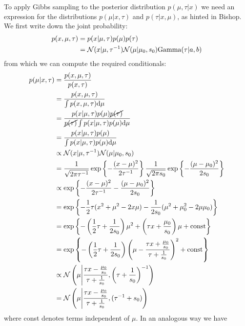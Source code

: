 \documentclass{amsmlaj}
\begin{document}
\begin{problem}
\newpage
\begin{sol}
	To apply Gibbs sampling to the posterior distribution $p(\mu,\tau|x)$ we need
	an expression for the distributions $p(\mu|x,\tau)$ and $p(\tau|x,\mu)$, as
	hinted in Bishop. We first write down the joint probability:
	\begin{align}
		p(x,\mu,\tau)
		&=p(x|\mu,\tau)p(\mu)p(\tau) \\
		&=\mathcal{N}(x|\mu,\tau^{-1})\mathcal{N}(\mu|\mu_0,s_0)\text{Gamma}(\tau|a,b)
	\end{align}
	from which we can compute the required conditionals:
	\begin{align}
		p(\mu|x,\tau)
		&=\frac{p(x,\mu,\tau)}{p(x,\tau)} \\
		&=\frac{p(x,\mu,\tau)}{\int p(x,\mu,\tau)\mathrm{d}\mu} \\
		&=\frac{p(x|\mu,\tau)p(\mu)\cancel{p(\tau)}}{\cancel{p(\tau)}\int p(x|\mu,\tau)p(\mu)\mathrm{d}\mu} \\
		&=\frac{p(x|\mu,\tau)p(\mu)}{\int p(x|\mu,\tau)p(\mu)\mathrm{d}\mu} \\
		&\propto \mathcal{N}(x|\mu,\tau^{-1}) \mathcal{N}(\mu|\mu_0,s_0) \\
		&=\frac{1}{\sqrt{2\pi\tau^{-1}}} \exp\left\{
			-\frac{(x-\mu)^2}{2\tau^{-1}}
		\right\} \frac{1}{\sqrt{2\pi s_0}} \exp\left\{
			-\frac{(\mu-\mu_0)^2}{2s_0}
		\right\} \\
		&\propto \exp\left\{
			-\frac{(x-\mu)^2}{2\tau^{-1}}
			-\frac{(\mu-\mu_0)^2}{2s_0}
		\right\} \\
		&= \exp\left\{
			-\frac{1}{2}\tau(x^2+\mu^2-2x\mu)
			-\frac{1}{2s_0}(\mu^2+\mu_0^2-2\mu\mu_0)
		\right\} \\
		&= \exp\left\{
			-\left(\frac{1}{2}\tau+\frac{1}{2s_0}\right)\mu^2
			+\left(\tau x + \frac{\mu_0}{s_0}\right)\mu
			+ \text{const}
		\right\} \\
		&= \exp\left\{
			-\left(\frac{1}{2}\tau+\frac{1}{2s_0}\right)
			\left(\mu-\frac{\tau x + \frac{\mu_0}{s_0}}{\tau+\frac{1}{s_0}}\right)^2
			+ \text{const}
		\right\} \\
		&\propto \mathcal{N}\left(
			\mu\middle|\frac{\tau x - \frac{\mu_0}{s_0}}{\tau+\frac{1}{s_0}},\left(\tau+\frac{1}{s_0}\right)^{-1}
		\right) \\
		&= \mathcal{N}\left(
		\mu\middle|\frac{\tau x - \frac{\mu_0}{s_0}}{\tau+\frac{1}{s_0}},(\tau^{-1}+s_0)
		\right)
	\end{align}
	where const denotes terms independent of $\mu$. In an analogous way we have
	\begin{align}

\end{align}
\end{sol}
\end{problem}
\end{document}
